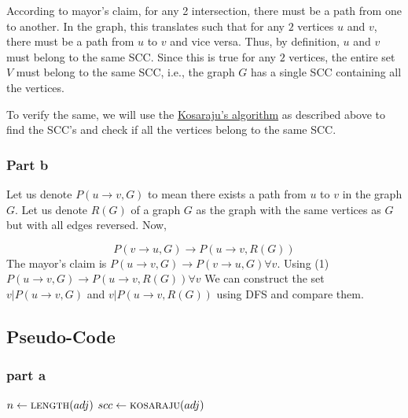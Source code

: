 \documentclass{article}
\begin{document}
According to mayor's claim, for any 2 intersection, there must be a path from one to another. In the graph, this translates such that for any $2$ vertices $u$ and $v$, there must be a path from $u$ to $v$ and vice versa. Thus, by definition, $u$ and $v$ must belong to the same SCC. Since this is true for any $2$ vertices, the entire set $V$ must belong to the same SCC, i.e., the graph $G$ has a single SCC containing all the vertices.

To verify the same, we will use the \underline{Kosaraju's algorithm} as described above to find the SCC's and check if all the vertices belong to the same SCC.

\subsubsection{Part b}

Let us denote $P(u \rightarrow v,G)$ to mean there exists a path from $u$ to $v$ in the graph $G$. Let us denote $R(G)$ of a graph $G$ as the graph with the same vertices as $G$ but with all edges reversed. Now, 

\begin{equation}
P(v\rightarrow u,G) \rightarrow P(u \rightarrow v,R(G))
\end{equation}
The mayor's claim is 
\newline
$P(u \rightarrow v,G) \rightarrow P(v \rightarrow u,G) \forall v$. 
\newline
Using (1)
\newline
$P(u \rightarrow v,G) \rightarrow P(u \rightarrow v,R(G)) \forall v$
\newline
We can construct the set $v | P(u \rightarrow v,G)$ and $v | P(u \rightarrow v,R(G))$ using DFS and compare them.

\subsection{Pseudo-Code}
\subsubsection{part a}

\begin{algorithmic}[1]

\State $n \gets \Call{length}{adj}$
\State $scc \gets \Call{kosaraju}{adj}$
\State {}
\EndIf
\EndFor
\State {}
\EndProcedure

\end{algorithmic}
\end{document}
